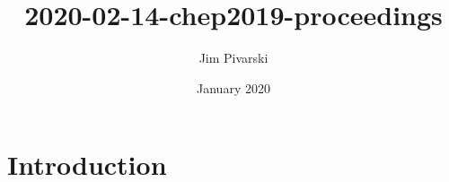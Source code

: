 \documentclass{article}
\title{2020-02-14-chep2019-proceedings}
\author{Jim Pivarski}
\date{January 2020}
\begin{document}
\maketitle

\section{Introduction}
\end{document}
